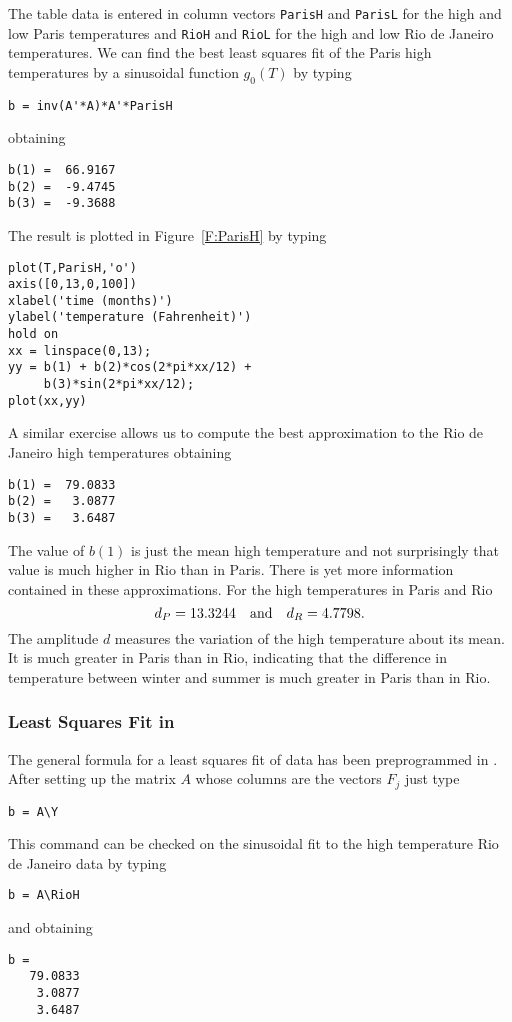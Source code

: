 \documentclass{ximera}
\begin{document}
The table data is entered in column vectors {\tt ParisH} and {\tt ParisL} for
the high and low Paris temperatures and {\tt RioH} and {\tt RioL} for the
high and low Rio de Janeiro temperatures.  We can find the best least squares
fit of the Paris high temperatures by a sinusoidal function $g_0(T)$ by typing
\begin{verbatim}
b = inv(A'*A)*A'*ParisH
\end{verbatim}
obtaining
\begin{verbatim}
b(1) =  66.9167
b(2) =  -9.4745
b(3) =  -9.3688
\end{verbatim}
The result is plotted in Figure~\ref{F:ParisH} by typing
\begin{verbatim}
plot(T,ParisH,'o')
axis([0,13,0,100])
xlabel('time (months)')
ylabel('temperature (Fahrenheit)')
hold on
xx = linspace(0,13);
yy = b(1) + b(2)*cos(2*pi*xx/12) + 
     b(3)*sin(2*pi*xx/12);
plot(xx,yy)
\end{verbatim}

\begin{figure*}[htb]
     \centerline{%
     }
     \caption{Monthly averages of daily high temperatures in Paris (left) and
	Rio de Janeiro (right) with best sinusoidal approximation.}
     \label{F:ParisH}
\end{figure*}

A similar exercise allows us to compute the best approximation to the
Rio de Janeiro high temperatures obtaining
\begin{verbatim}
b(1) =  79.0833
b(2) =   3.0877
b(3) =   3.6487
\end{verbatim}
The value of $b(1)$ is just the mean high temperature and not surprisingly
that value is much higher in Rio than in Paris.  There is yet more
information contained in these approximations.   For
the high temperatures in Paris and Rio
\[
d_P = 13.3244 \quad\mbox{and}\quad d_R = 4.7798.
\]
The amplitude $d$ measures the variation of the high temperature about its
mean.  It is much greater in Paris than in Rio, indicating that the
difference in temperature between winter and summer is much greater in Paris
than in Rio.

\subsubsection*{Least Squares Fit in \Matlabp}

The general formula for a least squares fit of data  has been
preprogrammed in \Matlabp.  After setting up the matrix $A$ whose columns are 
the vectors $F_j$ just type
\begin{verbatim}
b = A\Y
\end{verbatim}
This \Matlab command can be checked on the sinusoidal fit to the high 
temperature Rio de Janeiro data by typing
\begin{verbatim}
b = A\RioH
\end{verbatim} 
and obtaining
\begin{verbatim}
b =
   79.0833
    3.0877
    3.6487
\end{verbatim}
\end{document}
